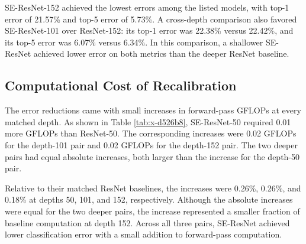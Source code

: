 SE-ResNet-152 achieved the lowest errors among the listed models, with top-1 error of 21.57\% and top-5 error of 5.73\%. A cross-depth comparison also favored SE-ResNet-101 over ResNet-152: its top-1 error was 22.38\% versus 22.42\%, and its top-5 error was 6.07\% versus 6.34\%. In this comparison, a shallower SE-ResNet achieved lower error on both metrics than the deeper ResNet baseline.

\subsection{Computational Cost of Recalibration}

The error reductions came with small increases in forward-pass GFLOPs at every matched depth. As shown in Table \ref{tab:x-d526b8}, SE-ResNet-50 required 0.01 more GFLOPs than ResNet-50. The corresponding increases were 0.02 GFLOPs for the depth-101 pair and 0.02 GFLOPs for the depth-152 pair. The two deeper pairs had equal absolute increases, both larger than the increase for the depth-50 pair.

Relative to their matched ResNet baselines, the increases were 0.26\%, 0.26\%, and 0.18\% at depths 50, 101, and 152, respectively. Although the absolute increases were equal for the two deeper pairs, the increase represented a smaller fraction of baseline computation at depth 152. Across all three pairs, SE-ResNet achieved lower classification error with a small addition to forward-pass computation.
